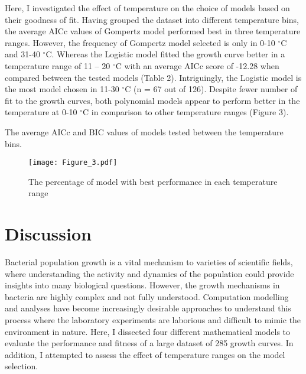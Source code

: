 \documentclass[12pt]{article}
\begin{document}
\begin{linenumbers}
\noindent Here, I investigated the effect of temperature on the choice of models based on their goodness of fit. Having grouped the dataset into different temperature bins, the average AICc values of Gompertz model performed best in three temperature ranges. However, the frequency of Gompertz model selected is only in 0-10 $^{\circ}$C and 31-40 $^{\circ}$C. Whereas the Logistic model fitted the growth curve better in a temperature range of 11 – 20 $^{\circ}$C with an average AICc score of -12.28 when compared between the tested models (Table 2). Intriguingly, the Logistic model is the most model chosen in 11-30 $^{\circ}$C (n = 67 out of 126). Despite fewer number of fit to the growth curves, both polynomial models appear to perform better in the temperature at 0-10 $^{\circ}$C in comparison to other temperature ranges (Figure 3).

\vspace{0.5cm}

    \begin{table}[H]
        \centering
        \vspace{0.5cm}
    \caption{The average AICc and BIC values of models tested between the temperature bins.}
    \end{table}

  \begin{figure}[H]
    \centering
    \texttt{[image: Figure\_3.pdf]}
    \caption{The percentage of model with best performance in each temperature range}
  \end{figure}
  
 \section{Discussion}
 
 \noindent Bacterial population growth is a vital mechanism to varieties of scientific fields, where understanding the activity and dynamics of the population could provide insights into many biological questions. However, the growth mechanisms in bacteria are highly complex and not fully understood. Computation modelling and analyses have become increasingly desirable approaches to understand this process where the laboratory experiments are laborious and difficult to mimic the environment in nature. Here, I dissected four different mathematical models to evaluate the performance and fitness of a large dataset of 285 growth curves. In addition, I attempted to assess the effect of temperature ranges on the model selection.
 

\end{linenumbers}
\end{document}
